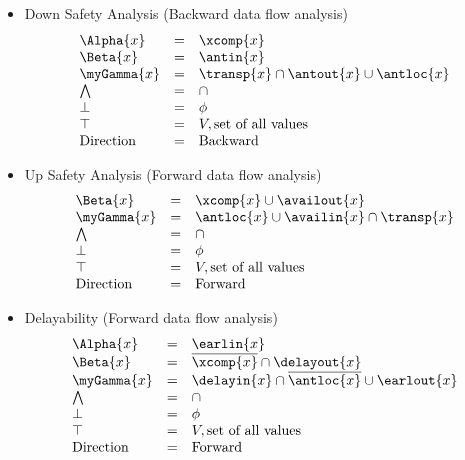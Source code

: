 \begin{itemize}
\item Down Safety Analysis (Backward data flow analysis)
\begin{equation}
\begin{array}{l c l}
\Alpha{x}     &=& \xcomp{x} \\
\Beta{x}      &=& \antin{x}     \\     
\myGamma{x}   &=& \transp{x} \cap \antout{x} \cup \antloc{x}\\
\bigwedge     &=&  \cap \\
\bot          &=& \phi \\
\top          &=& V, \text{set of all values} \\
\text{Direction}    &=& \text{Backward}
\end{array}
\end{equation}

\item Up Safety Analysis (Forward data flow analysis)
\begin{equation}
\begin{array}{l c l}
\Beta{x}      &=& \xcomp{x} \cup \availout{x}     \\     
\myGamma{x}   &=& \antloc{x} \cup \availin{x} \cap \transp{x}\\
\bigwedge     &=&  \cap \\
\bot          &=& \phi \\
\top          &=& V, \text{set of all values} \\
\text{Direction}    &=& \text{Forward}
\end{array}
\end{equation}

\item Delayability (Forward data flow analysis)
\begin{equation}
\begin{array}{l c l}
\Alpha{x}     &=& \earlin{x} \\
\Beta{x}      &=& \overline{\xcomp{x}} \cap \delayout{x}     \\     
\myGamma{x}   &=& \delayin{x} \cap \overline{\antloc{x}} \cup \earlout{x}\\
\bigwedge     &=&  \cap \\
\bot          &=& \phi \\
\top          &=& V, \text{set of all values} \\
\text{Direction}    &=& \text{Forward}
\end{array}
\end{equation}


\end{itemize}
